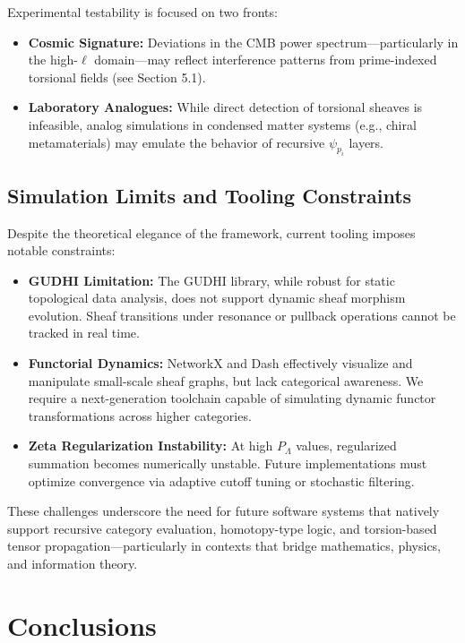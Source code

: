 \documentclass{article}
\theoremstyle{plain}
\begin{document}
Experimental testability is focused on two fronts:

\begin{itemize}
    \item \textbf{Cosmic Signature:} Deviations in the CMB power spectrum—particularly in the high-$\ell$ domain—may reflect interference patterns from prime-indexed torsional fields (see Section 5.1).
    \item \textbf{Laboratory Analogues:} While direct detection of torsional sheaves is infeasible, analog simulations in condensed matter systems (e.g., chiral metamaterials) may emulate the behavior of recursive $\psi_{p_i}$ layers.
\end{itemize}

\subsection{Simulation Limits and Tooling Constraints}

Despite the theoretical elegance of the framework, current tooling imposes notable constraints:

\begin{itemize}
    \item \textbf{GUDHI Limitation:} The GUDHI library, while robust for static topological data analysis, does not support dynamic sheaf morphism evolution. Sheaf transitions under resonance or pullback operations cannot be tracked in real time.
    
    \item \textbf{Functorial Dynamics:} NetworkX and Dash effectively visualize and manipulate small-scale sheaf graphs, but lack categorical awareness. We require a next-generation toolchain capable of simulating dynamic functor transformations across higher categories.
    
    \item \textbf{Zeta Regularization Instability:} At high $P_\Lambda$ values, regularized summation becomes numerically unstable. Future implementations must optimize convergence via adaptive cutoff tuning or stochastic filtering.
\end{itemize}

These challenges underscore the need for future software systems that natively support recursive category evaluation, homotopy-type logic, and torsion-based tensor propagation—particularly in contexts that bridge mathematics, physics, and information theory.

\section{Conclusions}
\end{document}
